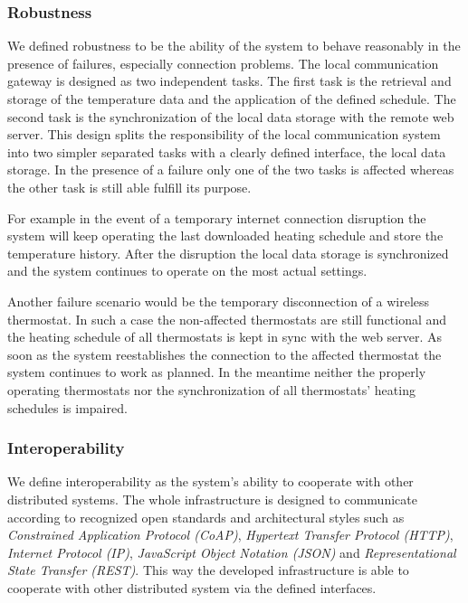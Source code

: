 \subsubsection{Robustness}

We defined robustness to be the ability of the system to behave reasonably in the presence of failures, especially connection problems.
The local communication gateway is designed as two independent tasks.
The first task is the retrieval and storage of the temperature data and the application of the defined schedule.
The second task is the synchronization of the local data storage with the remote web server.
This design splits the responsibility of the local communication system into two simpler separated tasks with a clearly defined interface, the local data storage.
In the presence of a failure only one of the two tasks is affected whereas the other task is still able fulfill its purpose.

For example in the event of a temporary internet connection disruption the system will keep operating the last downloaded heating schedule and store the temperature history.
After the disruption the local data storage is synchronized and the system continues to operate on the most actual settings.

Another failure scenario would be the temporary disconnection of a wireless thermostat.
In such a case the non-affected thermostats are still functional and the heating schedule of all thermostats is kept in sync with the web server.
As soon as the system reestablishes the connection to the affected thermostat the system continues to work as planned.
In the meantime neither the properly operating thermostats nor the synchronization of all thermostats' heating schedules is impaired.







\subsubsection{Interoperability}

We define interoperability as the system's ability to cooperate with other distributed systems.
The whole infrastructure is designed to communicate according to recognized open standards and architectural styles such as \emph{Constrained Application Protocol (CoAP)}, \emph{Hypertext Transfer Protocol (HTTP)}, \emph{Internet Protocol (IP)}, \emph{JavaScript Object Notation (JSON)} and \emph{Representational State Transfer (REST)}.
This way the developed infrastructure is able to cooperate with other distributed system via the defined interfaces.


